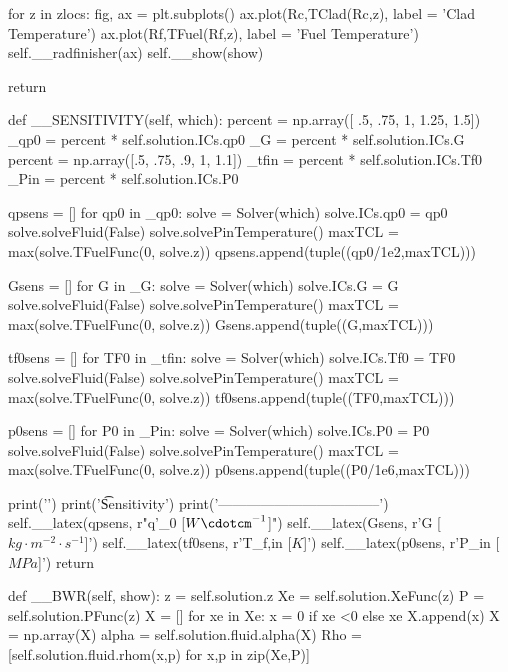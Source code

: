 \documentclass{article}
\begin{document}
\begin{python}
        for z in zlocs:
            fig, ax = plt.subplots()
            ax.plot(Rc,TClad(Rc,z), label = 'Clad Temperature')
            ax.plot(Rf,TFuel(Rf,z), label = 'Fuel Temperature')
            self.__radfinisher(ax)
            self.__show(show)

        
        return

    def __SENSITIVITY(self, which):
        percent = np.array([ .5, .75, 1, 1.25, 1.5])
        _qp0 = percent * self.solution.ICs.qp0
        _G = percent * self.solution.ICs.G
        percent = np.array([.5, .75, .9, 1, 1.1])
        _tfin =  percent * self.solution.ICs.Tf0
        _Pin = percent * self.solution.ICs.P0

        qpsens = []
        for qp0 in _qp0:
            solve = Solver(which)
            solve.ICs.qp0 = qp0
            solve.solveFluid(False)
            solve.solvePinTemperature()
            maxTCL = max(solve.TFuelFunc(0, solve.z))
            qpsens.append(tuple((qp0/1e2,maxTCL)))
        
        Gsens = []
        for G in _G:
            solve = Solver(which)
            solve.ICs.G = G
            solve.solveFluid(False)
            solve.solvePinTemperature()
            maxTCL = max(solve.TFuelFunc(0, solve.z))
            Gsens.append(tuple((G,maxTCL)))

        tf0sens = []
        for TF0 in _tfin:
            solve = Solver(which)
            solve.ICs.Tf0 = TF0
            solve.solveFluid(False)
            solve.solvePinTemperature()
            maxTCL = max(solve.TFuelFunc(0, solve.z))
            tf0sens.append(tuple((TF0,maxTCL)))
        
        p0sens = []
        for P0 in _Pin:
            solve = Solver(which)
            solve.ICs.P0 = P0
            solve.solveFluid(False)
            solve.solvePinTemperature()
            maxTCL = max(solve.TFuelFunc(0, solve.z))
            p0sens.append(tuple((P0/1e6,maxTCL)))

        print('\n\n')
        print('\t    Sensitivity')
        print('-----------------------------------')
        self.__latex(qpsens, r"q'_{0}  [$W\cdotcm^{-1}$]")
        self.__latex(Gsens, r'G  [$kg\cdot m^{-2} \cdot s^{-1}$]')
        self.__latex(tf0sens, r'T_{f,in}  [$K$]')
        self.__latex(p0sens, r'P_{in}  [$MPa$]')
        return
    
    def __BWR(self, show):
        z = self.solution.z
        Xe = self.solution.XeFunc(z)
        P = self.solution.PFunc(z)
        X = []
        for xe in Xe:
            x = 0 if xe <0 else xe
            X.append(x)
        X = np.array(X)
        alpha = self.solution.fluid.alpha(X)
        Rho = [self.solution.fluid.rhom(x,p) for x,p in zip(Xe,P)]


\end{python}
\end{document}
